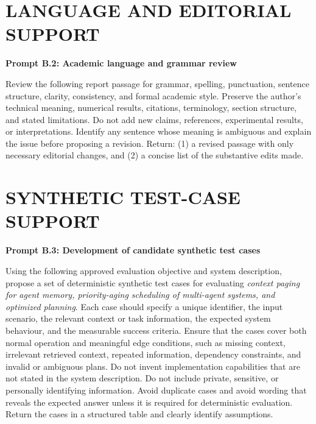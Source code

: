 \section{\texorpdfstring{\uppercase{Language and Editorial Support}}{Language and Editorial Support}}

\noindent\textbf{Prompt B.2: Academic language and grammar review}

\begin{aiprompt}
Review the following report passage for grammar, spelling, punctuation,
sentence structure, clarity, consistency, and formal academic style. Preserve
the author's technical meaning, numerical results, citations, terminology,
section structure, and stated limitations. Do not add new claims, references,
experimental results, or interpretations. Identify any sentence whose meaning
is ambiguous and explain the issue before proposing a revision. Return: (1) a
revised passage with only necessary editorial changes, and (2) a concise list of
the substantive edits made.
\end{aiprompt}
\clearpage
\section{\texorpdfstring{\uppercase{Synthetic Test-Case Support}}{Synthetic Test-Case Support}}

\noindent\textbf{Prompt B.3: Development of candidate synthetic test cases}

\begin{aiprompt}
Using the following approved evaluation objective and system description,
propose a set of deterministic synthetic test cases for evaluating
\textit{context paging for agent memory, priority-aging scheduling of multi-agent systems, and optimized planning}. Each case
should specify a unique identifier, the input scenario, the relevant context
or task information, the expected system behaviour, and the measurable success
criteria. Ensure that the cases cover both normal operation and meaningful
edge conditions, such as missing context, irrelevant retrieved context,
repeated information, dependency constraints, and invalid or ambiguous plans.
Do not invent implementation capabilities that are not stated in the system
description. Do not include private, sensitive, or personally identifying
information. Avoid duplicate cases and avoid wording that reveals the expected
answer unless it is required for deterministic evaluation. Return the cases in
a structured table and clearly identify assumptions.
\end{aiprompt}

